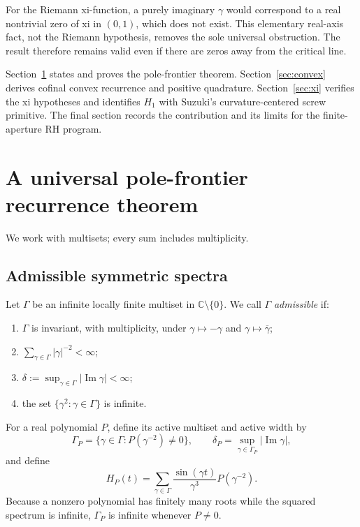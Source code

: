 \documentclass[11pt]{article}
\theoremstyle{remark}
\newcommand{\C}{\mathbb C}
\begin{document}
For the Riemann xi-function, a purely imaginary $\gamma$ would correspond to a real nontrivial
zero of xi in $(0,1)$, which does not exist.  This elementary real-axis fact, not the Riemann
hypothesis, removes the sole universal obstruction.  The result therefore remains valid even if
there are zeros away from the critical line.

Section~\ref{sec:universal} states and proves the pole-frontier theorem.  Section~\ref{sec:convex}
derives cofinal convex recurrence and positive quadrature.  Section~\ref{sec:xi} verifies the xi
hypotheses and identifies $H_1$ with Suzuki's curvature-centered screw primitive.  The final
section records the contribution and its limits for the finite-aperture RH program.

\section{A universal pole-frontier recurrence theorem}
\label{sec:universal}

We work with multisets; every sum includes multiplicity.

\subsection{Admissible symmetric spectra}

Let $\Gamma$ be an infinite locally finite multiset in $\C\setminus\{0\}$.  We call $\Gamma$
\emph{admissible} if:
\begin{enumerate}
\item $\Gamma$ is invariant, with multiplicity, under $\gamma\mapsto-\gamma$ and
      $\gamma\mapsto\overline\gamma$;
\item $\sum_{\gamma\in\Gamma}|\gamma|^{-2}<\infty$;
\item $\delta:=\sup_{\gamma\in\Gamma}|\operatorname{Im}\gamma|<\infty$;
\item the set $\{\gamma^2:\gamma\in\Gamma\}$ is infinite.
\end{enumerate}

For a real polynomial $P$, define its active multiset and active width by
\[
 \Gamma_P=\{\gamma\in\Gamma:P(\gamma^{-2})\neq0\},
 \qquad
 \delta_P=\sup_{\gamma\in\Gamma_P}|\operatorname{Im}\gamma|,
 \tag{2.1}
\]
and define
\[
  H_P(t)=\sum_{\gamma\in\Gamma}
  \frac{\sin(\gamma t)}{\gamma^3}P(\gamma^{-2}).
  \tag{2.2}
\]
Because a nonzero polynomial has finitely many roots while the squared spectrum is infinite,
$\Gamma_P$ is infinite whenever $P\neq0$.
\end{document}

